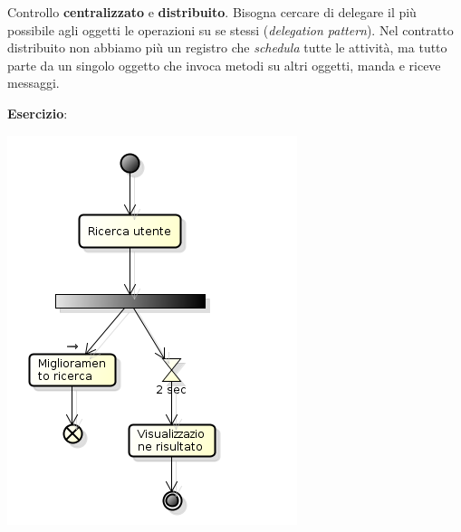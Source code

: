 Controllo \textbf{centralizzato} e \textbf{distribuito}. Bisogna cercare di delegare il più possibile agli oggetti le operazioni su se stessi (\textit{delegation pattern}). Nel contratto distribuito non abbiamo più un registro che \textit{schedula} tutte le attività, ma tutto parte da un singolo oggetto che invoca metodi su altri oggetti, manda e riceve messaggi.

\textbf{Esercizio}:

\begin{center}
\includegraphics[width=0.75\columnwidth]{img9} %
\end{center}